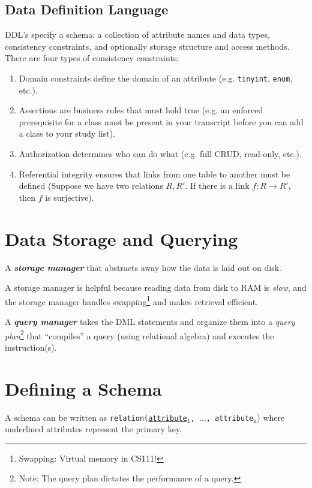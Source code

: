 \documentclass{report}
\newenvironment{definition}[1]{\begin{tcolorbox}[title={Definition: #1}]}{\end{tcolorbox}}
\renewcommand{\tt}[1]{\texttt{{#1}}}
\renewcommand{\it}[1]{\textit{{#1}}}
\newcommand{\ib}[1]{\textit{\textbf{{#1}}}}
\begin{document}
\subsection{Data Definition Language}
DDL's specify a schema: a collection of attribute names and data types, consistency constraints, and
optionally storage structure and access methods. There are four types of consistency constraints:
\begin{enumerate}[label=\it{(\roman*)}]
    \item Domain constraints define the domain of an attribute (e.g. \tt{tinyint}, \tt{enum}, etc.).
    \item Assertions are business rules that must hold true (e.g. an enforced prerequisite for a 
        class must be present in your transcript before you can add a class to your study list).
    \item Authorization determines who can do what (e.g. full CRUD, read-only, etc.).
    \item Referential integrity ensures that links from one table to another must be defined (Suppose
        we have two relations $R, R'$. If there is a link $f : R \to R'$, then $f$ is surjective).
\end{enumerate}


\section{Data Storage and Querying}
\begin{definition}{Storage Manager}
    A \ib{storage manager} that abstracts away how the data is laid out on disk.
\end{definition}
A storage manager is helpful because reading data from disk to RAM is \it{slow}, and the storage
manager handles swapping\footnote{Swapping: Virtual memory in CS111!} and makes retrieval efficient.

\begin{definition}{Query Manager}
    A \ib{query manager} takes the DML statements and organize them into a 
    \it{query plan}\footnote{Note: The query plan dictates the performance of a query.} that 
    ``compiles'' a query (using relational algebra) and executes the instruction(s).
\end{definition}


\section{Defining a Schema}
A schema can be written as \tt{relation(\underline{attribute$_{\tt{1}}$}, \tt{$\ldots$}, 
attribute$_{\tt{n}}$}) where underlined attributes represent the primary key.
\end{document}
